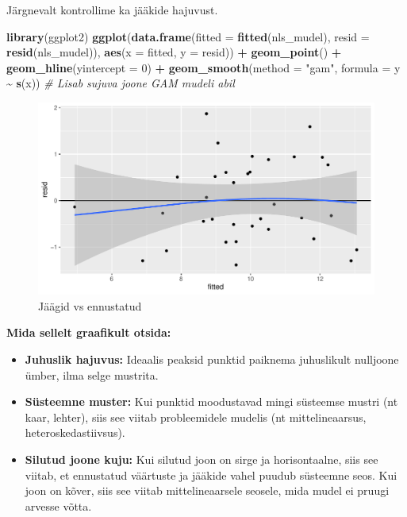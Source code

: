 \documentclass[
]{book}
\newenvironment{Shaded}{\begin{snugshade}}{\end{snugshade}}
\newcommand{\AttributeTok}[1]{\textcolor[rgb]{0.13,0.29,0.53}{#1}}
\newcommand{\CommentTok}[1]{\textcolor[rgb]{0.56,0.35,0.01}{\textit{#1}}}
\newcommand{\DecValTok}[1]{\textcolor[rgb]{0.00,0.00,0.81}{#1}}
\newcommand{\FunctionTok}[1]{\textcolor[rgb]{0.13,0.29,0.53}{\textbf{#1}}}
\newcommand{\NormalTok}[1]{#1}
\newcommand{\SpecialCharTok}[1]{\textcolor[rgb]{0.81,0.36,0.00}{\textbf{#1}}}
\newcommand{\StringTok}[1]{\textcolor[rgb]{0.31,0.60,0.02}{#1}}
\providecommand{\tightlist}{%
  \setlength{\itemsep}{0pt}\setlength{\parskip}{0pt}}
\renewenvironment{Shaded} {\begin{snugshade}\footnotesize} {\end{snugshade}}
\begin{document}
Järgnevalt kontrollime ka jääkide hajuvust.

\begin{Shaded}
\begin{Highlighting}[]
\FunctionTok{library}\NormalTok{(ggplot2)}
\FunctionTok{ggplot}\NormalTok{(}\FunctionTok{data.frame}\NormalTok{(}\AttributeTok{fitted =} \FunctionTok{fitted}\NormalTok{(nls\_mudel), }\AttributeTok{resid =} \FunctionTok{resid}\NormalTok{(nls\_mudel)),}
       \FunctionTok{aes}\NormalTok{(}\AttributeTok{x =}\NormalTok{ fitted, }\AttributeTok{y =}\NormalTok{ resid)) }\SpecialCharTok{+}
  \FunctionTok{geom\_point}\NormalTok{() }\SpecialCharTok{+}
  \FunctionTok{geom\_hline}\NormalTok{(}\AttributeTok{yintercept =} \DecValTok{0}\NormalTok{) }\SpecialCharTok{+}
  \FunctionTok{geom\_smooth}\NormalTok{(}\AttributeTok{method =} \StringTok{"gam"}\NormalTok{, }\AttributeTok{formula =}\NormalTok{ y }\SpecialCharTok{\textasciitilde{}} \FunctionTok{s}\NormalTok{(x))  }\CommentTok{\# Lisab sujuva joone GAM mudeli abil}
\end{Highlighting}
\end{Shaded}

\begin{figure}[H]
\includegraphics[width=0.8\linewidth]{_main_files/figure-latex/unnamed-chunk-68-1} \caption{Jäägid vs ennustatud}\label{fig:unnamed-chunk-68}
\end{figure}

\textbf{Mida sellelt graafikult otsida:}

\begin{itemize}
\tightlist
\item
  \textbf{Juhuslik hajuvus:} Ideaalis peaksid punktid paiknema juhuslikult nulljoone ümber, ilma selge mustrita.
\item
  \textbf{Süsteemne muster:} Kui punktid moodustavad mingi süsteemse mustri (nt kaar, lehter), siis see viitab probleemidele mudelis (nt mittelineaarsus, heteroskedastiivsus).
\item
  \textbf{Silutud joone kuju:} Kui silutud joon on sirge ja horisontaalne, siis see viitab, et ennustatud väärtuste ja jääkide vahel puudub süsteemne seos. Kui joon on kõver, siis see viitab mittelineaarsele seosele, mida mudel ei pruugi arvesse võtta.
\end{itemize}
\end{document}
